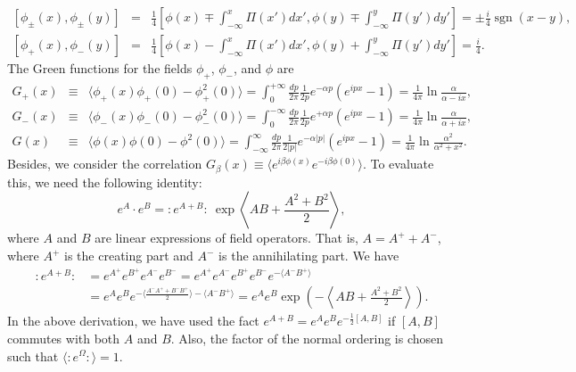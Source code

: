 \documentclass[aps,prb,superscriptaddress,nofootinbib]{revtex4}
\newcommand{\normord}[1]{{:\mathrel{#1}:}}
\begin{document}
\begin{eqnarray}
	\left[\phi_\pm(x),\phi_\pm(y)\right] 
	&=& \frac{1}{4}\left[\phi(x)\mp\int_{-\infty}^x \Pi(x')dx',\phi(y)\mp\int_{-\infty}^y \Pi(y')dy'\right]
	= \pm\frac{i}{4} \operatorname{sgn}(x-y), \\
	\left[\phi_+(x),\phi_-(y)\right] 
	&=& \frac{1}{4}\left[\phi(x)-\int_{-\infty}^x \Pi(x')dx',\phi(y)+\int_{-\infty}^y \Pi(y')dy'\right]
	= \frac{i}{4}.
\end{eqnarray}
The Green functions for the fields $\phi_+$, $\phi_-$, and $\phi$ are
\begin{eqnarray}
	G_+(x) &\equiv& \langle \phi_+(x)\phi_+(0)-\phi_+^2(0) \rangle 
	= \int_0^{+\infty} \frac{dp}{2\pi}\frac{1}{2p}e^{-\alpha p} \left(e^{ipx}-1\right)
	= \frac{1}{4\pi} \ln\frac{\alpha}{\alpha-ix}, \\
	G_-(x) &\equiv& \langle \phi_-(x)\phi_-(0)-\phi_-^2(0) \rangle 
	= \int_0^{-\infty} \frac{dp}{2\pi}\frac{1}{2p}e^{+\alpha p} \left(e^{ipx}-1\right)
	= \frac{1}{4\pi} \ln\frac{\alpha}{\alpha+ix}, \\
	G(x) &\equiv& \langle\phi(x)\phi(0)-\phi^2(0)\rangle 
	= \int_{-\infty}^{\infty} \frac{dp}{2\pi}\frac{1}{2|p|}e^{-\alpha |p|} \left(e^{ipx}-1\right)
	= \frac{1}{4\pi} \ln\frac{\alpha^2}{\alpha^2+x^2}.
\end{eqnarray}
Besides, we consider the correlation $G_\beta(x)\equiv\langle e^{i\beta\phi(x)} e^{-i\beta\phi(0)}\rangle$.
To evaluate this, we need the following identity:
\begin{equation}\label{eq:normord-id}
	e^A \cdot e^B = \normord{e^{A+B}} \ \exp\left\langle AB+\frac{A^2+B^2}{2}\right\rangle,
\end{equation}
where $A$ and $B$ are linear expressions of field operators.
That is, $A = A^+ + A^-$, where $A^+$ is the creating part and $A^-$ is the annihilating part.
We have
\begin{equation*}
\begin{aligned}
	\normord{e^{A+B}} &= e^{A^+} e^{B^+} e^{A^-} e^{B^-}
	= e^{A^+} e^{A^-} e^{B^+} e^{B^-} e^{-\langle A^- B^+\rangle} \\
	&= e^{A} e^{B} e^{-\langle\frac{A^-A^++B^-B^+}{2}\rangle-\langle A^- B^+\rangle}
	= e^{A} e^{B} \exp\left(-\left\langle AB+\frac{A^2+B^2}{2}\right\rangle\right).
\end{aligned}
\end{equation*}
In the above derivation, we have used the fact $e^{A+B}=e^A e^B e^{-\frac{1}{2}[A,B]}$ if $[A,B]$ commutes with both $A$ and $B$.
Also, the factor of the normal ordering is chosen such that $\langle\normord{e^{\Omega}}\rangle=1$.
\end{document}
